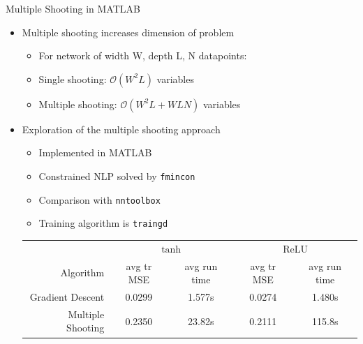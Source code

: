 \documentclass[11pt,t]{beamer}
\begin{document}
\begin{frame}[fragile]{Multiple Shooting in MATLAB}
\begin{itemize}
	\item Multiple shooting increases dimension of problem
	\begin{itemize}
		\item For network of width W, depth L, N datapoints:
		\item Single shooting: $\mathcal{O}(W^2L)$ variables
		\item Multiple shooting: $\mathcal{O}(W^2L + WLN)$ variables
	\end{itemize}
	\item Exploration of the multiple shooting approach
	\begin{itemize}
		\item Implemented in MATLAB
		\item Constrained NLP solved by \texttt{fmincon}
		\item Comparison with \texttt{nntoolbox}
		\item Training algorithm is \texttt{traingd}
	\end{itemize}
	\begin{table}
	\footnotesize
	\centering
	\hspace{-20pt}
	\begin{tabular}{r | c c | c c }
		& \multicolumn{2}{|c}{$\tanh$} & \multicolumn{2}{|c}{ReLU} \\
		Algorithm &avg tr MSE &avg run time & avg tr MSE & avg run time \\ \hline
		Gradient Descent & 0.0299 & 1.577s  & 0.0274 & 1.480s\\
		Multiple Shooting & 0.2350 & 23.82s & 0.2111 & 115.8s \\
	\end{tabular}
	\end{table}
\end{itemize}
\end{frame}
\end{document}
